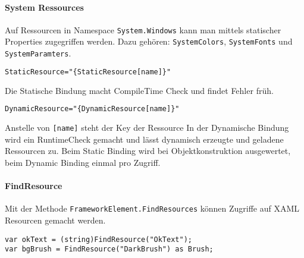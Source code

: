 \paragraph{System Ressources} Auf Ressourcen in Namespace \verb+System.Windows+ kann man mittels statischer Properties zugegriffen werden. Dazu gehören: \verb+SystemColors+, \verb+SystemFonts+ und \verb+SystemParamters+.
\begin{lstlisting}[language=xml]
StaticResource="{StaticResource[name]}"
\end{lstlisting}
Die Statische Bindung macht CompileTime Check und findet Fehler früh.
\begin{lstlisting}[language=xml]
DynamicResource="{DynamicResource[name]}"
\end{lstlisting}
Anstelle von \verb+[name]+ steht der Key der Ressource
In der Dynamische Bindung wird ein RuntimeCheck gemacht und lässt dynamisch erzeugte und geladene Ressourcen zu. Beim Static Binding wird bei Objektkonstruktion ausgewertet, beim Dynamic Binding einmal pro Zugriff.
\paragraph{FindResource} Mit der Methode \verb+FrameworkElement.FindResources+  können Zugriffe auf XAML Resourcen gemacht werden.
\begin{lstlisting}
var okText = (string)FindResource("OkText");
var bgBrush = FindResource("DarkBrush") as Brush;
\end{lstlisting}